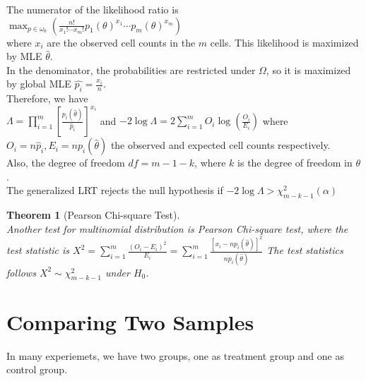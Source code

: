 \documentclass[12pt]{article}
\newtheorem{theorem}{Theorem}[section]
\theoremstyle{definition}
\begin{document}
The numerator of the likelihood ratio is\\
$
\max_{p\in\omega_0}(\frac{n!}{x_1!\cdots x_m!}p_1(\theta)^{x_1}\cdots p_m(\theta)^{x_m})
$\\
where $x_i$ are the observed cell counts in the $m$ cells. This likelihood is maximized by MLE $\hat{\theta}$.\\
In the denominator, the probabilities are restricted under $\Omega$, so it is maximized by global MLE $\hat{p_i}=\frac{x_i}{n}$.\\
Therefore, we have\\
$
\Lambda = \prod_{i=1}^m[\frac{p_i(\hat{\theta})}{\hat{p}_i}]^{x_i}
$
and
$
-2\log \Lambda = 2\sum_{i=1}^m O_i\log(\frac{O_i}{E_i})
$
where $O_i=n\hat{p}_i, E_i=np_i(\hat{\theta})$ the observed and expected cell counts respectively.\\
Also, the degree of freedom $df=m-1-k$, where $k$ is the degree of freedom in $\theta$.\\
The generalized LRT rejects the null hypothesis if
$
-2\log \Lambda>\chi^2_{m-k-1}(\alpha)
$
\begin{theorem}[Pearson Chi-square Test]
\hfill\\\normalfont Another test for multinomial distribution is Pearson Chi-square test, where the test statistic is
$
X^2=\sum_{i=1}^m \frac{(O_i-E_i)^2}{E_i}= \sum_{i=1}^m \frac{[x_i-np_i(\hat{\theta})]^2}{np_i(\hat{\theta})}
$
The test statistics follows $X^2\sim \chi^2_{m-k-1}$ under $H_0$.
\end{theorem}

\section{Comparing Two Samples}
In many experiemets, we have two groups, one as treatment group and one as control group.
\end{document}
